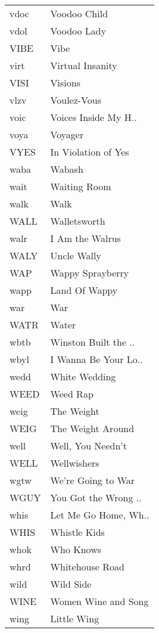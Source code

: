 \begin{supertabular}{ll}
 vdoc &          Voodoo Child \\
 vdol &           Voodoo Lady \\
 VIBE &                  Vibe \\
 virt &      Virtual Insanity \\
 VISI &               Visions \\
 vlzv &           Voulez-Vous \\
 voic &  Voices Inside My H.. \\
 voya &               Voyager \\
 VYES &   In Violation of Yes \\
 waba &                Wabash \\
 wait &          Waiting Room \\
 walk &                  Walk \\
 WALL &          Walletsworth \\
 walr &       I Am the Walrus \\
 WALY &           Uncle Wally \\
  WAP &      Wappy Sprayberry \\
 wapp &         Land Of Wappy \\
  war &                   War \\
 WATR &                 Water \\
 wbtb &  Winston Built the .. \\
 wbyl &  I Wanna Be Your Lo.. \\
 wedd &         White Wedding \\
 WEED &              Weed Rap \\
 weig &            The Weight \\
 WEIG &     The Weight Around \\
 well &     Well, You Needn't \\
 WELL &           Wellwishers \\
 wgtw &    We're Going to War \\
 WGUY &  You Got the Wrong .. \\
 whis &  Let Me Go Home, Wh.. \\
 WHIS &          Whistle Kids \\
 whok &             Who Knows \\
 whrd &       Whitehouse Road \\
 wild &             Wild Side \\
 WINE &   Women Wine and Song \\
 wing &           Little Wing \\

\end{supertabular}
